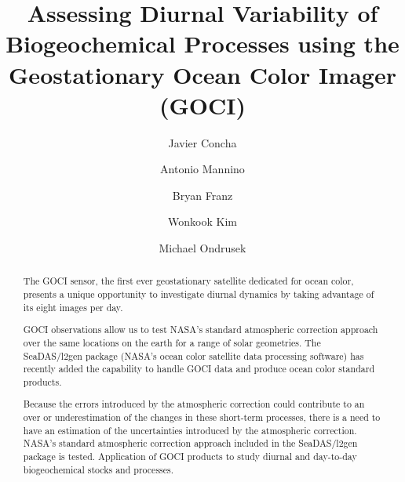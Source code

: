 \documentclass[onecolumn,3p,letterpaper,11pt]{elsarticle}
\begin{document}

\begin{frontmatter}

\title{Assessing Diurnal Variability of Biogeochemical Processes using the Geostationary Ocean Color Imager (GOCI)}


\author[oeladdress,usraaddress]{Javier Concha}

\author[oeladdress]{Antonio Mannino}

\author[oeladdress]{Bryan Franz}

\author[kiostaddress]{Wonkook Kim}

\author[usgsaddress]{Michael Ondrusek}

\address[oeladdress]{Ocean Ecology Lab, NASA Goddard Space Flight Center, Greenbelt, MD, USA}
\address[usraaddress]{Universities Space Research Association, Columbia, MD, USA}
\address[kiostaddress]{Korea Institute of Ocean Science and Technology, 787 Haean-ro, Ansan, Republic of Korea}

\address[usgsaddress]{NOAA/NESDIS Center for Weather and Climate Prediction, College Park, Maryland, USA}
\begin{abstract}

The GOCI sensor, the first ever geostationary satellite dedicated for ocean color, presents a unique opportunity to investigate diurnal dynamics by taking advantage of its eight images per day.
%

GOCI observations allow us to test NASA’s standard atmospheric correction approach over the same locations on the earth for a range of solar geometries.
%
The SeaDAS/l2gen package (NASA’s ocean color satellite data processing software) has recently added the capability to handle GOCI data and produce ocean color standard products.

%

%
Because the errors introduced by the atmospheric correction could contribute to an over or underestimation of the changes in these short-term processes, there is a need to have an estimation of the uncertainties introduced by the atmospheric correction.
%
NASA’s standard atmospheric correction approach included in the SeaDAS/l2gen package is tested.
%
Application of GOCI products to study diurnal and day-to-day biogeochemical stocks and processes.


\end{abstract}
\end{frontmatter}
\end{document}
